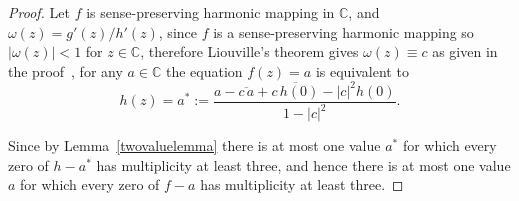 \documentclass[10pt,a4paper]{amsart}
\numberwithin{equation}{section}
\begin{document}
\begin{proof}
Let $f$ is sense-preserving harmonic mapping in $\mathbb{C}$,
 and $\omega(z)=g'(z)/h'(z)$, since $f$ is a sense-preserving harmonic 
mapping so $|\omega(z)|<1$ for $z\in\mathbb{C}$, 
therefore Liouville's theorem gives
$\omega(z)\equiv c$ as given in the proof~\cite[Lemma~2.5]{Bohra}, 
for any $a\in\mathbb{C}$ the equation
$f(z)=a$ is equivalent to
\begin{equation}\label{eq: hequivf}
h(z)=a^{*}:=
\frac{a-\overline{c\,a}
+\overline{c\,h(0)}-|c|^{2}h(0)}
{1-|c|^{2}}.
\end{equation}


Since by Lemma~\ref{twovaluelemma} there is at most
one value $a^{*}$ for which every zero of $h-a^{*}$ has 
multiplicity at least three, and hence there
is at most one value $a$ for which every zero of $f-a$
 has multiplicity at least three.
\end{proof}
\end{document}
